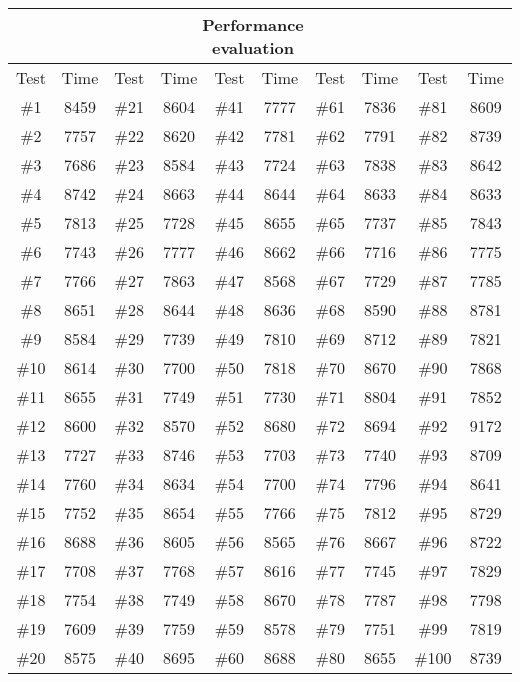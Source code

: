 \centering
\begin{tabular}{cccccccccc}
  \toprule
  &  & & \multicolumn{4}{c}{Performance evaluation} & & & \\
  \toprule
  Test & Time & Test & Time & Test & Time & Test & Time & Test & Time \\
  \cmidrule(lr){1-2} \cmidrule(lr){3-4} \cmidrule(lr){5-6} \cmidrule(lr){7-8} \cmidrule(lr){9-10}

  \#1 & 8459 & \#21 & 8604 & \#41 & 7777 & \#61 & 7836 & \#81 & 8609 \\
  \#2 & 7757 & \#22 & 8620 & \#42 & 7781 & \#62 & 7791 & \#82 & 8739 \\
  \#3 & 7686 & \#23 & 8584 & \#43 & 7724 & \#63 & 7838 & \#83 & 8642 \\
  \#4 & 8742 & \#24 & 8663 & \#44 & 8644 & \#64 & 8633 & \#84 & 8633 \\
  \#5 & 7813 & \#25 & 7728 & \#45 & 8655 & \#65 & 7737 & \#85 & 7843 \\
  \#6 & 7743 & \#26 & 7777 & \#46 & 8662 & \#66 & 7716 & \#86 & 7775 \\
  \#7 & 7766 & \#27 & 7863 & \#47 & 8568 & \#67 & 7729 & \#87 & 7785 \\
  \#8 & 8651 & \#28 & 8644 & \#48 & 8636 & \#68 & 8590 & \#88 & 8781 \\
  \#9 & 8584 & \#29 & 7739 & \#49 & 7810 & \#69 & 8712 & \#89 & 7821 \\
  \#10 & 8614 & \#30 & 7700 & \#50 & 7818 & \#70 & 8670 & \#90 & 7868 \\
  \#11 & 8655 & \#31 & 7749 & \#51 & 7730 & \#71 & 8804 & \#91 & 7852 \\
  \#12 & 8600 & \#32 & 8570 & \#52 & 8680 & \#72 & 8694 & \#92 & 9172 \\
  \#13 & 7727 & \#33 & 8746 & \#53 & 7703 & \#73 & 7740 & \#93 & 8709 \\
  \#14 & 7760 & \#34 & 8634 & \#54 & 7700 & \#74 & 7796 & \#94 & 8641 \\
  \#15 & 7752 & \#35 & 8654 & \#55 & 7766 & \#75 & 7812 & \#95 & 8729 \\
  \#16 & 8688 & \#36 & 8605 & \#56 & 8565 & \#76 & 8667 & \#96 & 8722 \\
  \#17 & 7708 & \#37 & 7768 & \#57 & 8616 & \#77 & 7745 & \#97 & 7829 \\
  \#18 & 7754 & \#38 & 7749 & \#58 & 8670 & \#78 & 7787 & \#98 & 7798 \\
  \#19 & 7609 & \#39 & 7759 & \#59 & 8578 & \#79 & 7751 & \#99 & 7819 \\
  \#20 & 8575 & \#40 & 8695 & \#60 & 8688 & \#80 & 8655 & \#100 & 8739
\end{tabular}

